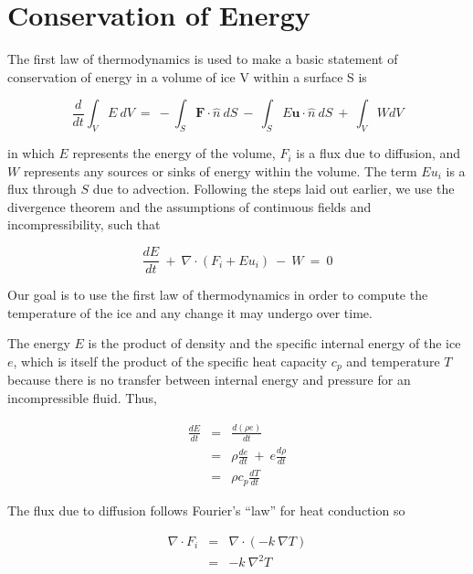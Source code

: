 \section{Conservation of Energy}


The first law of thermodynamics is used to make a basic statement of
conservation of energy in a volume of ice V within a surface S is

\begin{equation}
\frac{d}{d t} \int_{V}E ~dV~=~- \int_{S}\mathbf{F}\cdot \hat{n}~dS~-~\int_{S}E \mathbf{u}\cdot \hat{n}~dS~+~\int_{V}W dV
\end{equation}

in which $E$ represents the energy of the volume, $F_{i}$ is a flux due
to diffusion, and $W$ represents any sources or sinks of energy within
the volume. The term $Eu_{i}$ is a flux through $S$ due to advection.
Following the steps laid out earlier, we use the divergence theorem and
the assumptions of continuous fields and incompressibility, such that

\begin{equation}
\frac{dE}{dt}~+~\nabla \cdot \left(F_{i} +E u_{i}  \right)~-~W~=~0
\end{equation}

Our goal is to use the first law of thermodynamics in order to compute
the temperature of the ice and any change it may undergo over time.

The energy $E$ is the product of density and the specific internal
energy of the ice $e$, which is itself the product of the specific heat
capacity $c_{p}$ and temperature $T$ because there is no transfer
between internal energy and pressure for an incompressible fluid. Thus,

\begin{equation}
\begin{matrix}
\frac{dE}{dt}&=&\frac{d\left(\rho e \right)}{dt} \\
&=&\rho\frac{de}{dt}~+~e \frac{d\rho}{dt}\\
&=&\rho c_{p} \frac{dT}{dt}
\end{matrix}
\end{equation}

The flux due to diffusion follows Fourier's ``law'' for heat conduction
so

\begin{equation}
\begin{matrix}
\nabla \cdot F_{i}&=&\nabla \cdot \left( -k ~\nabla T  \right) \\
&=&-k~\nabla^{2}T
\end{matrix}
\end{equation}

